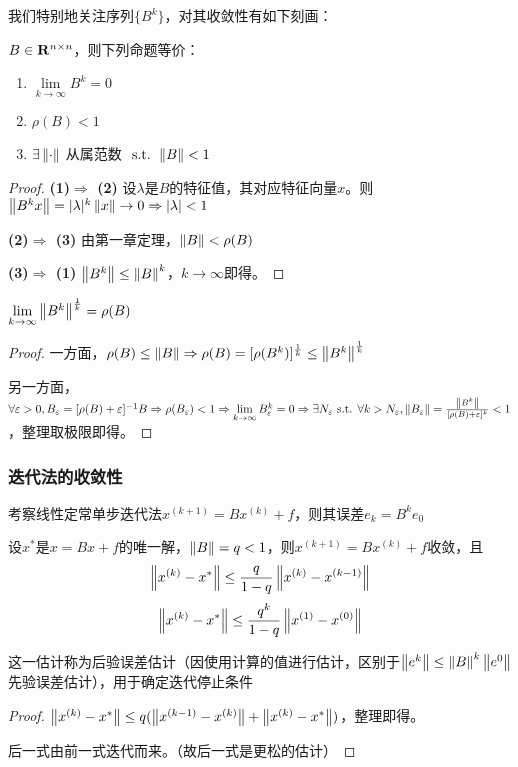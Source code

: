 \documentclass{ctexart}
\begin{document}
我们特别地关注序列$\{B^k\}$，对其收敛性有如下刻画：
\begin{Thm}
$B\in \mathbf{R}^{n\times n}$，则下列命题等价：
\begin{enumerate}
\item $\lim\limits_{k\to\infty}B^k=0$
\item $\rho(B)<1$
\item $\exists \left\|\cdot \right\|$ 从属范数 $\text{ s.t. } \left\|B \right\|<1$
\end{enumerate}
\end{Thm}

\begin{proof}
\textbf{(1)$\Rightarrow$ (2) }设$\lambda$是$B$的特征值，其对应特征向量$x$。则$\left\|B^kx \right\|=|\lambda|^k\left\|x \right\|\to 0\Rightarrow |\lambda|<1$

\textbf{(2)$\Rightarrow$ (3) }由第一章定理，$\left\|B \right\|<\rho(B)$

\textbf{(3)$\Rightarrow$ (1) }$\left\|B^k \right\|\leq \left\|B \right\|^k$，$k\to\infty$即得。
\end{proof}

\begin{Thm}
$\lim\limits_{k\to\infty}\left\|B^k \right\|^{\frac 1 k}=\rho(B)$
\end{Thm}
\begin{proof}
一方面，$\rho(B)\leq\left\|B \right\|\Rightarrow \rho(B)=[\rho(B^k)]^{\frac 1 k}\leq \left\|B^k \right\|^{\frac 1 k}$

另一方面，$\forall\varepsilon>0, B_\varepsilon=[\rho(B)+\varepsilon]^{-1}B\Rightarrow \rho(B_\varepsilon)<1\Rightarrow \lim\limits_{k\to\infty}B_\varepsilon^k=0\Rightarrow \exists N_\varepsilon\text{ s.t. }\forall k>N_\varepsilon, \left\|B_\varepsilon \right\|=\frac{\left\|B^k \right\|}{[\rho(B)+\varepsilon]^k}<1$，整理取极限即得。
\end{proof}


\subsubsection{迭代法的收敛性}
考察线性定常单步迭代法$x^{(k+1)}=Bx^{(k)}+f$，则其误差$e_k=B^ke_0$

\begin{Thm}
设$x^*$是$x=Bx+f$的唯一解，$\left\|B \right\|=q<1$，则$x^{(k+1)}=Bx^{(k)}+f$收敛，且\[\left\|x^{(k)}-x^* \right\|\leq \frac{q}{1-q}\left\|x^{(k)}-x^{(k-1)} \right\|\]
\[\left\|x^{(k)}-x^* \right\|\leq \frac{q^k}{1-q}\left\|x^{(1)}-x^{(0)} \right\|\]
\end{Thm}
这一估计称为后验误差估计（因使用计算的值进行估计，区别于$\left\|e^k \right\|\leq \left\|B \right\|^k\left\|e^0 \right\|$先验误差估计），用于确定迭代停止条件
\begin{proof}
$\left\|x^{(k)}-x^* \right\|\leq q(\left\|x^{(k-1)}-x^{(k)} \right\|+\left\|x^{(k)}-x^* \right\|)$，整理即得。

后一式由前一式迭代而来。（故后一式是更松的估计）
\end{proof}
\end{document}
